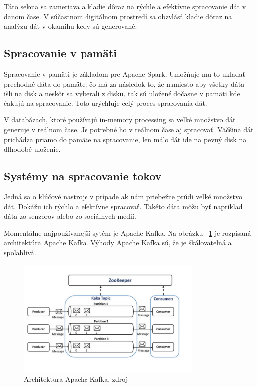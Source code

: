 \documentclass[10pt,twoside,slovak,a4paper]{article}
\begin{document}
Táto sekcia sa zameriava a kladie dôraz na rýchle a efektívne spracovanie dát v danom čase. V súčastnom digitálnom prostredí sa obzvlásť kladie dôraz na analýzu dát v okamihu kedy sú generované.

\subsection {Spracovanie v pamäti} \label{InMemory}

Spracovanie v pamäti je základom pre Apache Spark. Umožňuje mu to ukladať prechodné dáta do pamäte, čo má za následok to, že namiesto aby všetky dáta išli na disk a neskôr sa vyberali z disku, tak sú uložené dočasne v pamäti kde čakujú na spracovanie. Toto urýchluje celý proces spracovania dát.~\cite{Apache}

V databázach, ktoré používajú in-memory processing sa veľké množstvo dát generuje v reálnom čase. Je potrebné ho v reálnom čase aj spracovať. Väčšina dát prichádza priamo do pamäte na spracovanie, len málo dát ide na pevný disk na dlhodobé uloženie. ~\cite{InMemoryArticle}

\subsection {Systémy na spracovanie tokov}

Jedná sa o klúčové nastroje v prípade ak nám priebežne prúdi veľké množstvo dát. Dokážu ich rýchlo a efektívne spracovať. Takéto dáta môžu byť napríklad dáta zo senzorov alebo zo sociálnych medií.

Momentálne najpoužívanejší sytém je Apache Kafka. Na obrázku ~\ref{ApacheKafkaObrazok} je rozpísaná architektúra Apache Kafka. Výhody Apache Kafka sú, že je škálovatelná a spoľahlivá. ~\cite{ApacheKafka}
\begin{figure}[H]
  \centering
  \includegraphics[width=0.8\textwidth]{ApacheKafka.jpg}
  \caption{Architektura Apache Kafka, zdroj \cite{ApacheKafka}}
  \label{ApacheKafkaObrazok}
\end{figure}
\end{document}
